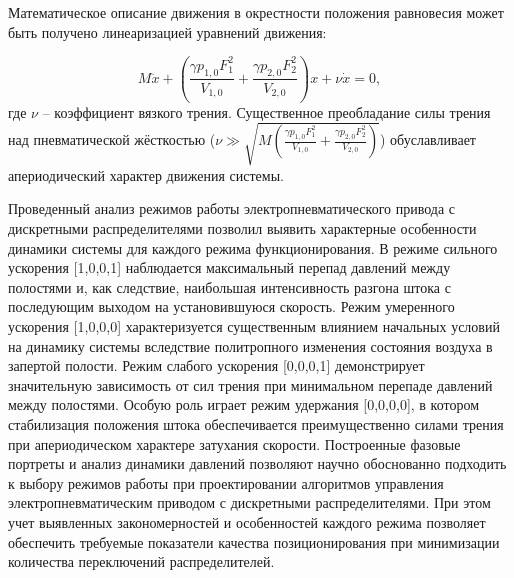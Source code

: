 Математическое описание движения в окрестности положения равновесия может быть получено линеаризацией уравнений движения:

\begin{equation}
	M\ddot{x} + \left(\frac{\gamma p_{1,0}F_1^2}{V_{1,0}} + \frac{\gamma p_{2,0}F_2^2}{V_{2,0}}\right)x + \nu\dot{x} = 0,
\end{equation}
где $\nu$ -- коэффициент вязкого трения. Существенное преобладание силы трения над пневматической жёсткостью
($\nu \gg \sqrt{M\left(\frac{\gamma p_{1,0}F_1^2}{V_{1,0}} + \frac{\gamma p_{2,0}F_2^2}{V_{2,0}}\right)}$) обуславливает апериодический характер движения системы.

Проведенный анализ режимов работы электропневматического привода с дискретными распределителями
позволил выявить характерные особенности динамики системы для каждого режима функционирования.
В режиме сильного ускорения [1,0,0,1] наблюдается максимальный перепад давлений между полостями и,
как следствие, наибольшая интенсивность разгона штока с последующим выходом на установившуюся скорость.
Режим умеренного ускорения [1,0,0,0] характеризуется существенным влиянием начальных условий на динамику
системы вследствие политропного изменения состояния воздуха в запертой полости. Режим слабого ускорения
[0,0,0,1] демонстрирует значительную зависимость от сил трения при минимальном перепаде давлений между полостями.
Особую роль играет режим удержания [0,0,0,0], в котором стабилизация положения штока обеспечивается преимущественно
силами трения при апериодическом характере затухания скорости. Построенные фазовые портреты и анализ динамики давлений
позволяют научно обоснованно подходить к выбору режимов работы при проектировании алгоритмов управления электропневматическим
приводом с дискретными распределителями. При этом учет выявленных закономерностей и особенностей каждого режима позволяет
обеспечить требуемые показатели качества позиционирования при минимизации количества переключений распределителей.
